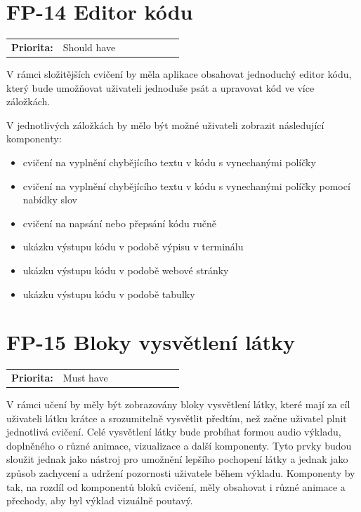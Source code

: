 \section{FP-14 Editor kódu}\label{sec:fp-code-editor}

\begin{tabular}{lp{0.7\linewidth}}
    \textbf{Priorita:} & Should have \\
\end{tabular}

V rámci složitějších cvičení by měla aplikace obsahovat jednoduchý editor kódu, který bude umožňovat uživateli jednoduše psát a upravovat kód ve více záložkách.

V jednotlivých záložkách by mělo být možné uživateli zobrazit následující komponenty:

\begin{itemize}
    \item cvičení na vyplnění chybějícího textu v kódu s vynechanými políčky
    \item cvičení na vyplnění chybějícího textu v kódu s vynechanými políčky pomocí nabídky slov
    \item cvičení na napsání nebo přepsání kódu ručně
    \item ukázku výstupu kódu v podobě výpisu v terminálu
    \item ukázku výstupu kódu v podobě webové stránky
    \item ukázku výstupu kódu v podobě tabulky
\end{itemize}

\section{FP-15 Bloky vysvětlení látky}\label{sec:fp-explanation-blocks}

\begin{tabular}{lp{0.7\linewidth}}
    \textbf{Priorita:} & Must have \\
\end{tabular}

V rámci učení by měly být zobrazovány bloky vysvětlení látky, které mají za cíl uživateli látku krátce a srozumitelně vysvětlit předtím, než začne uživatel plnit jednotlivá cvičení. Celé vysvětlení látky bude probíhat formou audio výkladu, doplněného o různé animace, vizualizace a další komponenty. Tyto prvky budou sloužit jednak jako nástroj pro umožnění lepšího pochopení látky a jednak jako způsob zachycení a udržení pozornosti uživatele během výkladu. Komponenty by tak, na rozdíl od komponentů bloků cvičení, měly obsahovat i různé animace a přechody, aby byl výklad vizuálně poutavý.

